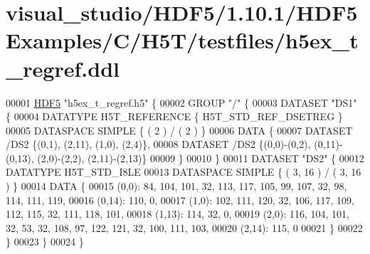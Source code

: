 \hypertarget{visual__studio_2_h_d_f5_21_810_81_2_h_d_f5_examples_2_c_2_h5_t_2testfiles_2h5ex__t__regref_8ddl_source}{}\section{visual\+\_\+studio/\+H\+D\+F5/1.10.1/\+H\+D\+F5\+Examples/\+C/\+H5\+T/testfiles/h5ex\+\_\+t\+\_\+regref.ddl}
\label{visual__studio_2_h_d_f5_21_810_81_2_h_d_f5_examples_2_c_2_h5_t_2testfiles_2h5ex__t__regref_8ddl_source}

\begin{DoxyCode}
00001 \hyperlink{namespace_h_d_f5}{HDF5} \textcolor{stringliteral}{"h5ex\_t\_regref.h5"} \{
00002 GROUP \textcolor{stringliteral}{"/"} \{
00003    DATASET \textcolor{stringliteral}{"DS1"} \{
00004       DATATYPE  H5T\_REFERENCE \{ H5T\_STD\_REF\_DSETREG \}
00005       DATASPACE  SIMPLE \{ ( 2 ) / ( 2 ) \}
00006       DATA \{
00007          DATASET /DS2 \{(0,1), (2,11), (1,0), (2,4)\},
00008          DATASET /DS2 \{(0,0)-(0,2), (0,11)-(0,13), (2,0)-(2,2), (2,11)-(2,13)\}
00009       \}
00010    \}
00011    DATASET \textcolor{stringliteral}{"DS2"} \{
00012       DATATYPE  H5T\_STD\_I8LE
00013       DATASPACE  SIMPLE \{ ( 3, 16 ) / ( 3, 16 ) \}
00014       DATA \{
00015       (0,0): 84, 104, 101, 32, 113, 117, 105, 99, 107, 32, 98, 114, 111, 119,
00016       (0,14): 110, 0,
00017       (1,0): 102, 111, 120, 32, 106, 117, 109, 112, 115, 32, 111, 118, 101,
00018       (1,13): 114, 32, 0,
00019       (2,0): 116, 104, 101, 32, 53, 32, 108, 97, 122, 121, 32, 100, 111, 103,
00020       (2,14): 115, 0
00021       \}
00022    \}
00023 \}
00024 \}
\end{DoxyCode}

